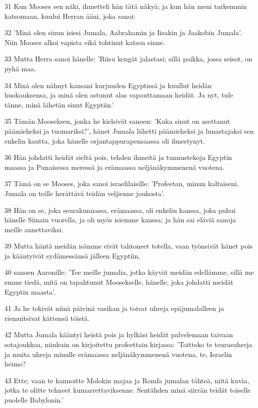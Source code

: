 \par 31 Kun Mooses sen näki, ihmetteli hän tätä näkyä; ja kun hän meni tarkemmin katsomaan, kuului Herran ääni, joka sanoi:
\par 32 'Minä olen sinun isiesi Jumala, Aabrahamin ja Iisakin ja Jaakobin Jumala'. Niin Mooses alkoi vapista eikä tohtinut katsoa sinne.
\par 33 Mutta Herra sanoi hänelle: 'Riisu kengät jalastasi; sillä paikka, jossa seisot, on pyhä maa.
\par 34 Minä olen nähnyt kansani kurjuuden Egyptissä ja kuullut heidän huokauksensa, ja minä olen astunut alas vapauttamaan heidät. Ja nyt, tule tänne, minä lähetän sinut Egyptiin.'
\par 35 Tämän Mooseksen, jonka he kielsivät sanoen: 'Kuka sinut on asettanut päämieheksi ja tuomariksi?', hänet Jumala lähetti päämieheksi ja lunastajaksi sen enkelin kautta, joka hänelle orjantappurapensaassa oli ilmestynyt.
\par 36 Hän johdatti heidät sieltä pois, tehden ihmeitä ja tunnustekoja Egyptin maassa ja Punaisessa meressä ja erämaassa neljänäkymmenenä vuotena.
\par 37 Tämä on se Mooses, joka sanoi israelilaisille: 'Profeetan, minun kaltaiseni, Jumala on teille herättävä teidän veljienne joukosta'.
\par 38 Hän on se, joka seurakunnassa, erämaassa, oli enkelin kanssa, joka puhui hänelle Siinain vuorella, ja oli myös isiemme kanssa; ja hän sai eläviä sanoja meille annettaviksi.
\par 39 Mutta häntä meidän isämme eivät tahtoneet totella, vaan työnsivät hänet pois ja kääntyivät sydämessänsä jälleen Egyptiin,
\par 40 sanoen Aaronille: 'Tee meille jumalia, jotka käyvät meidän edellämme, sillä me emme tiedä, mitä on tapahtunut Moosekselle, hänelle, joka johdatti meidät Egyptin maasta'.
\par 41 Ja he tekivät niinä päivinä vasikan ja toivat uhreja epäjumalalleen ja riemuitsivat kättensä töistä.
\par 42 Mutta Jumala kääntyi heistä pois ja hylkäsi heidät palvelemaan taivaan sotajoukkoa, niinkuin on kirjoitettu profeettain kirjassa: 'Toitteko te teurasuhreja ja muita uhreja minulle erämaassa neljänäkymmenenä vuotena, te, Israelin heimo?
\par 43 Ette; vaan te kannoitte Molokin majaa ja Romfa jumalan tähteä, niitä kuvia, jotka te olitte tehneet kumarrettaviksenne. Sentähden minä siirrän teidät toiselle puolelle Babylonin.'
